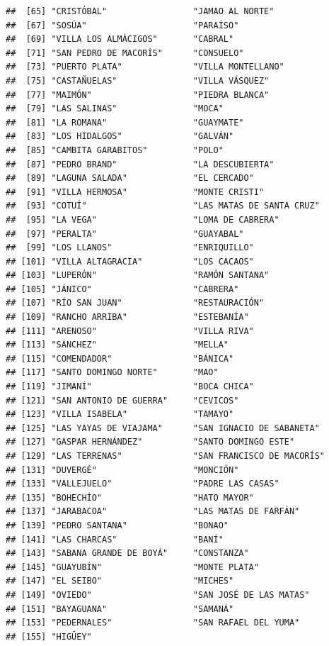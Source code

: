 \documentclass[11pt,]{article}
\begin{document}
\begin{verbatim}
##  [65] "CRISTÓBAL"                 "JAMAO AL NORTE"           
##  [67] "SOSÚA"                     "PARAÍSO"                  
##  [69] "VILLA LOS ALMÁCIGOS"       "CABRAL"                   
##  [71] "SAN PEDRO DE MACORÍS"      "CONSUELO"                 
##  [73] "PUERTO PLATA"              "VILLA MONTELLANO"         
##  [75] "CASTAÑUELAS"               "VILLA VÁSQUEZ"            
##  [77] "MAIMÓN"                    "PIEDRA BLANCA"            
##  [79] "LAS SALINAS"               "MOCA"                     
##  [81] "LA ROMANA"                 "GUAYMATE"                 
##  [83] "LOS HIDALGOS"              "GALVÁN"                   
##  [85] "CAMBITA GARABITOS"         "POLO"                     
##  [87] "PEDRO BRAND"               "LA DESCUBIERTA"           
##  [89] "LAGUNA SALADA"             "EL CERCADO"               
##  [91] "VILLA HERMOSA"             "MONTE CRISTI"             
##  [93] "COTUÍ"                     "LAS MATAS DE SANTA CRUZ"  
##  [95] "LA VEGA"                   "LOMA DE CABRERA"          
##  [97] "PERALTA"                   "GUAYABAL"                 
##  [99] "LOS LLANOS"                "ENRIQUILLO"               
## [101] "VILLA ALTAGRACIA"          "LOS CACAOS"               
## [103] "LUPERÓN"                   "RAMÓN SANTANA"            
## [105] "JÁNICO"                    "CABRERA"                  
## [107] "RÍO SAN JUAN"              "RESTAURACIÓN"             
## [109] "RANCHO ARRIBA"             "ESTEBANÍA"                
## [111] "ARENOSO"                   "VILLA RIVA"               
## [113] "SÁNCHEZ"                   "MELLA"                    
## [115] "COMENDADOR"                "BÁNICA"                   
## [117] "SANTO DOMINGO NORTE"       "MAO"                      
## [119] "JIMANÍ"                    "BOCA CHICA"               
## [121] "SAN ANTONIO DE GUERRA"     "CEVICOS"                  
## [123] "VILLA ISABELA"             "TAMAYO"                   
## [125] "LAS YAYAS DE VIAJAMA"      "SAN IGNACIO DE SABANETA"  
## [127] "GASPAR HERNÁNDEZ"          "SANTO DOMINGO ESTE"       
## [129] "LAS TERRENAS"              "SAN FRANCISCO DE MACORÍS" 
## [131] "DUVERGÉ"                   "MONCIÓN"                  
## [133] "VALLEJUELO"                "PADRE LAS CASAS"          
## [135] "BOHECHÍO"                  "HATO MAYOR"               
## [137] "JARABACOA"                 "LAS MATAS DE FARFÁN"      
## [139] "PEDRO SANTANA"             "BONAO"                    
## [141] "LAS CHARCAS"               "BANÍ"                     
## [143] "SABANA GRANDE DE BOYÁ"     "CONSTANZA"                
## [145] "GUAYUBÍN"                  "MONTE PLATA"              
## [147] "EL SEIBO"                  "MICHES"                   
## [149] "OVIEDO"                    "SAN JOSÉ DE LAS MATAS"    
## [151] "BAYAGUANA"                 "SAMANÁ"                   
## [153] "PEDERNALES"                "SAN RAFAEL DEL YUMA"      
## [155] "HIGÜEY"
\end{verbatim}
\end{document}
